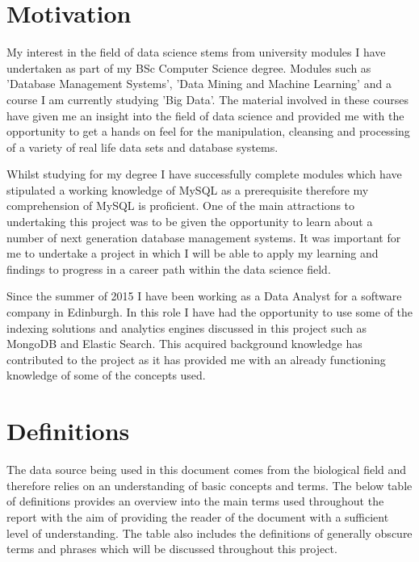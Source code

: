\section{Motivation}
My interest in the field of data science stems from university modules I have undertaken as part of my BSc Computer Science degree. Modules such as 'Database Management Systems', 'Data Mining and Machine Learning' and a course I am currently studying 'Big Data'. The material involved in these courses have given me an insight into the field of data science and provided me with the opportunity to get a hands on feel for the manipulation, cleansing and processing of a variety of real life data sets and database systems.

Whilst studying for my degree I have successfully complete modules which have stipulated a working knowledge of MySQL as a prerequisite therefore my comprehension of MySQL is proficient. One of the main attractions to undertaking this project was to be given the opportunity to learn about a number of next generation database management systems. It was important for me to undertake a project in which I will be able to apply my learning and findings to progress in a career path within the data science field.

Since the summer of 2015 I have been working as a Data Analyst for a software company in Edinburgh. In this role I have had the opportunity to use some of the indexing solutions and analytics engines discussed in this project such as MongoDB and Elastic Search. This acquired background knowledge has contributed to the project as it has provided me with an already functioning knowledge of some of the concepts used.

\section{Definitions}
The data source being used in this document comes from the biological field and therefore relies on an understanding of basic concepts and terms. The below table of definitions provides an overview into the main terms used throughout the report with the aim of providing the reader of the document with a sufficient level of understanding. The table also includes the definitions of generally obscure terms and phrases which will be discussed throughout this project.

